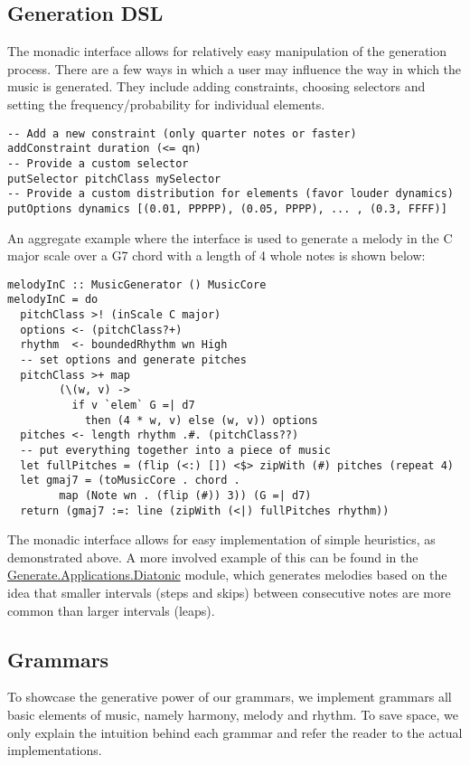 \documentclass[11pt,a4paper]{article}
\begin{document}
\subsection{Generation DSL}
The monadic interface allows for relatively easy manipulation of the generation process. There are a few ways in which a user may influence the way in which the music is generated. They include adding constraints, choosing selectors and setting the frequency/probability for individual elements.
\begin{verbatim}
-- Add a new constraint (only quarter notes or faster)
addConstraint duration (<= qn)
-- Provide a custom selector
putSelector pitchClass mySelector
-- Provide a custom distribution for elements (favor louder dynamics)
putOptions dynamics [(0.01, PPPPP), (0.05, PPPP), ... , (0.3, FFFF)]
\end{verbatim}

An aggregate example where the interface is used to generate a melody in the C major scale over a G7 chord with a length of 4 whole notes is shown below:
\begin{verbatim}
melodyInC :: MusicGenerator () MusicCore
melodyInC = do
  pitchClass >! (inScale C major)
  options <- (pitchClass?+)
  rhythm  <- boundedRhythm wn High
  -- set options and generate pitches
  pitchClass >+ map
        (\(w, v) ->
          if v `elem` G =| d7
            then (4 * w, v) else (w, v)) options
  pitches <- length rhythm .#. (pitchClass??)
  -- put everything together into a piece of music
  let fullPitches = (flip (<:) []) <$> zipWith (#) pitches (repeat 4)
  let gmaj7 = (toMusicCore . chord .
        map (Note wn . (flip (#)) 3)) (G =| d7)
  return (gmaj7 :=: line (zipWith (<|) fullPitches rhythm))
\end{verbatim}

The monadic interface allows for easy implementation of simple heuristics, as demonstrated above. A more involved example of this can be found in the \href{https://github.com/omelkonian/AlgoRhythm/tree/master/AlgoRhythm/src/Generate/Applications}{Generate.Applications.Diatonic} module, which generates melodies based on the idea that smaller intervals (steps and skips) between consecutive notes are more common than larger intervals (leaps).

\subsection{Grammars}
To showcase the generative power of our grammars, we implement grammars all basic elements of music, namely harmony, melody and rhythm. To save space, we only explain the intuition behind each grammar and refer the reader to the actual implementations.
\end{document}
